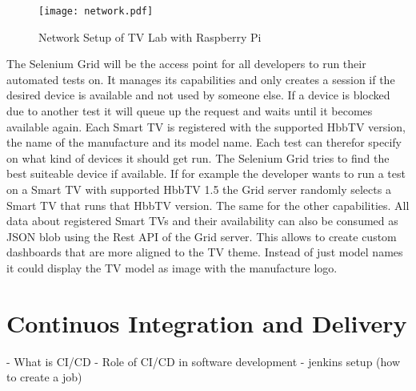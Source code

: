 \vspace{1cm}
\begin{figure}[htb]
  \centering
  \texttt{[image: network.pdf]}\\
  \caption{Network Setup of TV Lab with Raspberry Pi}\label{fig:network}
\end{figure}
\vspace{0.5cm}

The Selenium Grid will be the access point for all developers to run their automated tests on. It
manages its capabilities and only creates a session if the desired device is available and not used
by someone else. If a device is blocked due to another test it will queue up the request and waits
until it becomes available again. Each Smart TV is registered with the supported HbbTV version, the
name of the manufacture and its model name. Each test can therefor specify on what kind of devices
it should get run. The Selenium Grid tries to find the best suiteable device if available. If for
example the developer wants to run a test on a Smart TV with supported HbbTV 1.5 the Grid server
randomly selects a Smart TV that runs that HbbTV version. The same for the other capabilities. All
data about registered Smart TVs and their availability can also be consumed as JSON blob using
the Rest API of the Grid server. This allows to create custom dashboards that are more aligned to
the TV theme. Instead of just model names it could display the TV model as image with the manufacture
logo.

\section{Continuos Integration and Delivery\label{sec:cicd}}

- What is CI/CD
- Role of CI/CD in software development
- jenkins setup (how to create a job)
